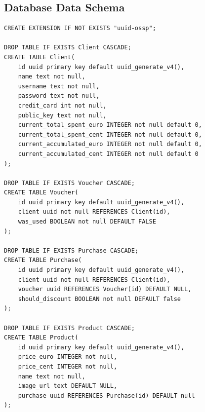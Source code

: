 \documentclass[12pt]{article}
\begin{document}
\subsection{Database Data Schema}
\begin{verbatim}
CREATE EXTENSION IF NOT EXISTS "uuid-ossp";

DROP TABLE IF EXISTS Client CASCADE;
CREATE TABLE Client(
	id uuid primary key default uuid_generate_v4(),
	name text not null,
	username text not null,
	password text not null,
	credit_card int not null,
	public_key text not null,
	current_total_spent_euro INTEGER not null default 0,
	current_total_spent_cent INTEGER not null default 0,
	current_accumulated_euro INTEGER not null default 0,
	current_accumulated_cent INTEGER not null default 0
);

DROP TABLE IF EXISTS Voucher CASCADE;
CREATE TABLE Voucher(
	id uuid primary key default uuid_generate_v4(),
	client uuid not null REFERENCES Client(id),
	was_used BOOLEAN not null DEFAULT FALSE
);

DROP TABLE IF EXISTS Purchase CASCADE;
CREATE TABLE Purchase(
	id uuid primary key default uuid_generate_v4(),
	client uuid not null REFERENCES Client(id),
	voucher uuid REFERENCES Voucher(id) DEFAULT NULL,
	should_discount BOOLEAN not null DEFAULT false
);

DROP TABLE IF EXISTS Product CASCADE;
CREATE TABLE Product(
	id uuid primary key default uuid_generate_v4(),
	price_euro INTEGER not null,
	price_cent INTEGER not null,
	name text not null,
	image_url text DEFAULT NULL,
	purchase uuid REFERENCES Purchase(id) DEFAULT null
);
\end{verbatim}
\end{document}
